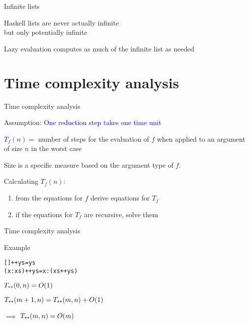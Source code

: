 \documentclass{beamer}
\def\code#1{\texttt{\frenchspacing#1}}
\begin{document}
\begin{frame}{Infinite lists}

\begin{block}{\centering Haskell lists are never actually infinite \\ but only potentially infinite}
\end{block}

\begin{block}{\centering Lazy evaluation computes as much of the infinite list as needed}
\end{block}

\end{frame}

\section{Time complexity analysis}

\begin{frame}{Time complexity analysis}

Assumption: \textcolor{blue}{One reduction step takes one time unit}

\pause

\vspace{0.5cm}
\textcolor{blue}{$T_f(n) = $} number of steps for the evaluation of $f$ when applied to an argument of size $n$ in the worst case

\pause

\vspace{0.5cm}
Size is a specific measure based on the argument type of $f$.

\pause

\vspace{0.5cm}
Calculating $T_f(n)$:
\begin{enumerate}
    \item from the equations for $f$ derive equations for $T_f$
    \item if the equations for $T_f$ are recursive, solve them
\end{enumerate}

\end{frame}

\begin{frame}[fragile]{Time complexity analysis}

\begin{exampleblock}{Example}
\begin{alltt}
[] ++ ys = ys
(x:xs) ++ ys = x : (xs ++ ys)
\end{alltt}

\pause

$T_{\code{++}}(0, n) = O(1)$ \par\pause
$T_{\code{++}}(m + 1, n) = T_{\code{++}}(m, n) + O(1)$ \par\pause
$\implies$ \textcolor{blue}{$T_{\code{++}}(m, n) = O(m)$}
\end{exampleblock}

\end{frame}
\end{document}
